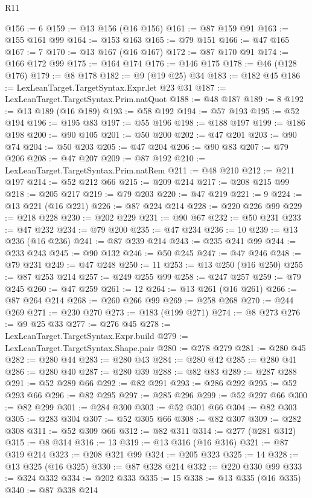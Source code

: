 \begin{lexlean}{R11}
\begin{coremodule}
@156 := 6
@159 := @13 @156 (@16 @156)
@161 := @87 @159 @91
@163 := @155 @161 @99
@164 := @153 @163
@165 := @79 @151
@166 := @47 @165
@167 := 7
@170 := @13 @167 (@16 @167)
@172 := @87 @170 @91
@174 := @166 @172 @99
@175 := @164 @174
@176 := @146 @175
@178 := @46 (@128 @176)
@179 := @8 @178
@182 := @9 (@19 @25) @34
@183 := @182 @45
@186 := LexLeanTarget.TargetSyntax.Expr.let @23 @31
@187 := LexLeanTarget.TargetSyntax.Prim.natQuot
@188 := @48 @187
@189 := 8
@192 := @13 @189 (@16 @189)
@193 := @58 @192
@194 := @57 @193
@195 := @52 @194
@196 := @195 @83
@197 := @55 @196
@198 := @188 @197
@199 := @186 @198
@200 := @90 @105
@201 := @50 @200
@202 := @47 @201
@203 := @90 @74
@204 := @50 @203
@205 := @47 @204
@206 := @90 @83
@207 := @79 @206
@208 := @47 @207
@209 := @87 @192
@210 := LexLeanTarget.TargetSyntax.Prim.natRem
@211 := @48 @210
@212 := @211 @197
@214 := @52 @212 @66
@215 := @209 @214
@217 := @208 @215 @99
@218 := @205 @217
@219 := @79 @203
@220 := @47 @219
@221 := 9
@224 := @13 @221 (@16 @221)
@226 := @87 @224 @214
@228 := @220 @226 @99
@229 := @218 @228
@230 := @202 @229
@231 := @90 @67
@232 := @50 @231
@233 := @47 @232
@234 := @79 @200
@235 := @47 @234
@236 := 10
@239 := @13 @236 (@16 @236)
@241 := @87 @239 @214
@243 := @235 @241 @99
@244 := @233 @243
@245 := @90 @132
@246 := @50 @245
@247 := @47 @246
@248 := @79 @231
@249 := @47 @248
@250 := 11
@253 := @13 @250 (@16 @250)
@255 := @87 @253 @214
@257 := @249 @255 @99
@258 := @247 @257
@259 := @79 @245
@260 := @47 @259
@261 := 12
@264 := @13 @261 (@16 @261)
@266 := @87 @264 @214
@268 := @260 @266 @99
@269 := @258 @268
@270 := @244 @269
@271 := @230 @270
@273 := @183 (@199 @271)
@274 := @8 @273
@276 := @9 @25 @33
@277 := @276 @45
@278 := LexLeanTarget.TargetSyntax.Expr.build
@279 := LexLeanTarget.TargetSyntax.Shape.pair
@280 := @278 @279
@281 := @280 @45
@282 := @280 @44
@283 := @280 @43
@284 := @280 @42
@285 := @280 @41
@286 := @280 @40
@287 := @280 @39
@288 := @82 @83
@289 := @287 @288
@291 := @52 @289 @66
@292 := @82 @291
@293 := @286 @292
@295 := @52 @293 @66
@296 := @82 @295
@297 := @285 @296
@299 := @52 @297 @66
@300 := @82 @299
@301 := @284 @300
@303 := @52 @301 @66
@304 := @82 @303
@305 := @283 @304
@307 := @52 @305 @66
@308 := @82 @307
@309 := @282 @308
@311 := @52 @309 @66
@312 := @82 @311
@314 := @277 (@281 @312)
@315 := @8 @314
@316 := 13
@319 := @13 @316 (@16 @316)
@321 := @87 @319 @214
@323 := @208 @321 @99
@324 := @205 @323
@325 := 14
@328 := @13 @325 (@16 @325)
@330 := @87 @328 @214
@332 := @220 @330 @99
@333 := @324 @332
@334 := @202 @333
@335 := 15
@338 := @13 @335 (@16 @335)
@340 := @87 @338 @214

\end{coremodule}
\end{lexlean}
